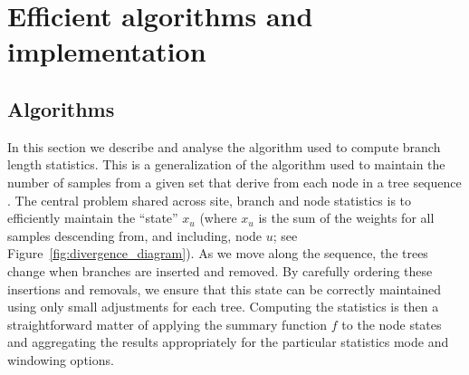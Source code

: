 \documentclass{article}
\begin{document}
\section*{Efficient algorithms and implementation}

\subsection*{Algorithms}
In this section we describe and analyse the algorithm used
to compute branch length statistics. This is a generalization
of the algorithm used to maintain the number of samples from a
given set that derive from each node in a tree
sequence \cite[Algorithm L]{kelleher2016efficient}. The central
problem shared across site, branch and node statistics
is to efficiently maintain the ``state'' $x_u$ (where $x_u$ is the
sum of the weights for all samples descending
from, and including, node $u$; see Figure~\ref{fig:divergence_diagram}).
As we move along the sequence, the trees change when branches are inserted and removed.
By carefully ordering these insertions and removals,
we ensure that this state can be correctly maintained
using only small adjustments for each tree.
Computing the statistics is then a straightforward matter of applying the summary function $f$
to the node states and aggregating the results appropriately for the
particular statistics mode and windowing options.
\end{document}
